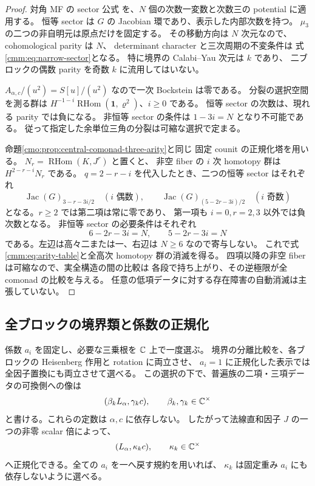 \begin{proof}
対角 MF の sector 公式
\cite[Theorem~5.39 and its proof, pp.~82--84]{NFBFKKernels}
を、$N$ 個の次数一変数と次数三の potential に適用する。
恒等 sector は $G$ の Jacobian 環であり、表示した内部次数を持つ。
$\mu_3$ の二つの非自明元は原点だけを固定する。
その移動方向は $N$ 次元なので、cohomological parity は $N$、
determinant character と三次周期の不変条件は
式\eqref{cmm:eq:narrow-sector}となる。
特に境界の Calabi--Yau 次元は $k$ であり、
二ブロックの偶数 parity を奇数 $k$ に流用してはいない。

$A_{\alpha,c}/(u^2)=S[u]/(u^2)$ なので一次 Bockstein は零である。
分裂の選択空間を測る群は
$H^{-1-i}\operatorname{RHom}(\mathbf1,\varrho^2)$、$i\ge0$ である。
恒等 sector の次数は、現れる parity では負になる。
非恒等 sector の条件は $1-3i=N$ となり不可能である。
従って指定した余単位三角の分裂は可縮な選択で定まる。

命題\ref{cmo:prop:central-comonad-three-arity}と同じ
固定 counit の正規化塔を用いる。
$N_r=\operatorname{RHom}(K,J^r)$ と置くと、
非空 fiber の $i$ 次 homotopy 群は $H^{2-r-i}N_r$ である。
$q=2-r-i$ を代入したとき、二つの恒等 sector はそれぞれ
\[
 \operatorname{Jac}(G)_{3-r-3i/2}\quad(i\text{ 偶数}),\qquad
 \operatorname{Jac}(G)_{(5-2r-3i)/2}\quad(i\text{ 奇数})
\]
となる。$r\ge2$ では第二項は常に零であり、
第一項も $i=0,r=2,3$ 以外では負次数となる。
非恒等 sector の必要条件はそれぞれ
\[
 6-2r-3i=N,\qquad 5-2r-3i=N
\]
である。左辺は高々二または一、右辺は $N\ge6$ なので寄与しない。
これで式\eqref{cmm:eq:arity-table}と全高次 homotopy 群の消滅を得る。
四項以降の非空 fiber は可縮なので、実全構造の間の比較は
各段で持ち上がり、その逆極限が全 comonad の比較を与える。
任意の低項データに対する存在障害の自動消滅は主張していない。
\end{proof}

\subsection{全ブロックの境界類と係数の正規化}

\begin{lemma}[同一因子の対称性を保つ境界比較]
\label{cmm:lem:boundary-parameters}
係数 $a_i$ を固定し、必要な三乗根を $\mathbb C$ 上で一度選ぶ。
境界の分離比較を、各ブロックの Heisenberg 作用と rotation に両立させ、
$a_i=1$ に正規化した表示では全因子置換にも両立させて選べる。
この選択の下で、普遍族の二項・三項データの可換側への像は
\[
 (\beta_k L_\alpha,\gamma_k c),\qquad
       \beta_k,\gamma_k\in\mathbb C^\times
\]
と書ける。これらの定数は $\alpha,c$ に依存しない。
したがって法線直和因子 $J$ の一つの非零 scalar 倍によって、
\begin{equation}\label{cmm:eq:kappa}
 (L_\alpha,\kappa_k c),\qquad\kappa_k\in\mathbb C^\times
\end{equation}
へ正規化できる。全ての $a_i$ を一へ戻す規約を用いれば、
$\kappa_k$ は固定重み $a_i$ にも依存しないように選べる。
\end{lemma}

